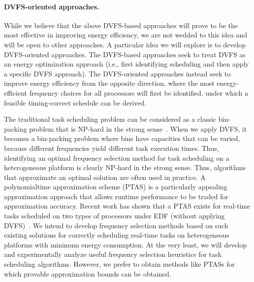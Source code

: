 \paragraph{DVFS-oriented approaches.} While we believe that the above DVFS-based approaches will prove to be the most effective in improving energy efficiency, we are not wedded to this idea and will be open to other approaches. A particular idea we will explore is to develop DVFS-oriented approaches. The DVFS-based approaches seek to treat DVFS as an energy optimization approach (i.e., first identifying scheduling and then apply a specific DVFS approach). The DVFS-oriented approaches instead seek to improve energy efficiency from the opposite direction, where the most energy-efficient frequency choices for all processors will first be identified, under which a feasible timing-correct schedule can be derived. 

The traditional task scheduling problem can be considered as a classic bin-packing problem that is NP-hard in the strong sense~\cite{coffman1978application}. When we apply DVFS, it becomes a bin-packing problem where bins have capacities that can be varied, because different frequencies yield different task execution times. Thus, identifying an optimal frequency selection method for task scheduling on a heterogeneous platform is clearly NP-hard in the strong sense. Thus, algorithms that approximate an optimal solution are often used in practice. A polynomialtime approximation scheme (PTAS) is a particularly appealing approximation approach that allows runtime performance to be traded for approximation accuracy.  
Recent work has shown that a PTAS exists for real-time tasks scheduled on two types of processors under EDF (without applying DVFS)~\cite{baruah2011task}. We intend to develop frequency selection methods based on such existing solutions for correctly scheduling real-time tasks on heterogeneous platforms with minimum energy consumption.  At the very least, we will develop and experimentally analyze useful frequency selection heuristics for task scheduling algorithms. However, we prefer to obtain methods like PTASs for which provable approximation bounds can be obtained.


